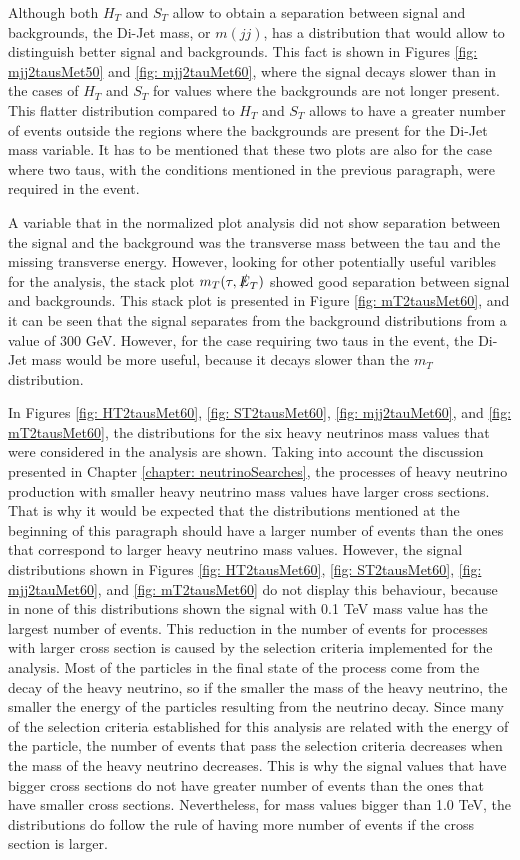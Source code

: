 Although both $H_{T}$ and $S_{T}$ allow to obtain a separation between signal and backgrounds, the Di-Jet mass, or $m(jj)$, has a distribution that would allow to distinguish better signal and backgrounds. This fact is shown in Figures \ref{fig: mjj2tausMet50} and \ref{fig: mjj2tauMet60}, where the signal decays slower than in the cases of $H_{T}$ and $S_{T}$ for values where the backgrounds are not longer present. This flatter distribution compared to $H_{T}$ and $S_{T}$ allows to have a greater number of events outside the regions where the backgrounds are present for the Di-Jet mass variable. It has to be mentioned that these two plots are also for the case where two taus, with the conditions mentioned in the previous paragraph, were required in the event. 

A variable that in the normalized plot analysis did not show separation between the signal and the background was the transverse mass between the tau and the missing transverse energy. However, looking for other potentially useful varibles for the analysis, the stack plot $m_{T}(\tau, \slashed{E}_{T})$ showed good separation between signal and backgrounds. This stack plot is presented in Figure \ref{fig: mT2tausMet60}, and it can be seen that the signal separates from the background distributions from a value of 300 GeV. However, for the case requiring two taus in the event, the Di-Jet mass would be more useful, because it decays slower than the $m_{T}$ distribution. 

In Figures \ref{fig: HT2tausMet60}, \ref{fig: ST2tausMet60}, \ref{fig: mjj2tauMet60}, and \ref{fig: mT2tausMet60}, the distributions for the six heavy neutrinos mass values that were considered in the analysis are shown. Taking into account the discussion presented in Chapter \ref{chapter: neutrinoSearches}, the processes of heavy neutrino production with smaller heavy neutrino mass values have larger cross sections. That is why it would be expected that the distributions mentioned at the beginning of this paragraph should have a larger number of events than the ones that correspond to larger heavy neutrino mass values. However, the signal distributions shown in Figures \ref{fig: HT2tausMet60}, \ref{fig: ST2tausMet60}, \ref{fig: mjj2tauMet60}, and \ref{fig: mT2tausMet60} do not display this behaviour, because in none of this distributions shown the signal with 0.1 TeV mass value has the largest number of events. This reduction in the number of events for processes with larger cross section is caused by the selection criteria implemented for the analysis. Most of the particles in the final state of the process come from the decay of the heavy neutrino, so if the smaller the mass of the heavy neutrino, the smaller the energy of the particles resulting from the neutrino decay. Since many of the selection criteria established for this analysis are related with the energy of the particle, the number of events that pass the selection criteria decreases when the mass of the heavy neutrino decreases. This is why the signal values that have bigger cross sections do not have greater number of events than the ones that have smaller cross sections. Nevertheless, for mass values bigger than 1.0 TeV, the distributions do follow the rule of having more number of events if the cross section is larger. 

